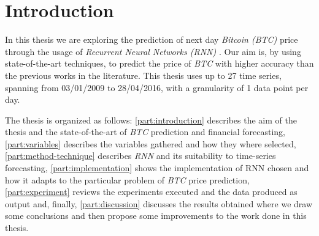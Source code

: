 
\chapter{Introduction} %

\label{ch:introduction}

In this thesis we are exploring the prediction of next day
\textit{Bitcoin (BTC)} price through the usage of \textit{Recurrent
Neural Networks (RNN)} . Our aim is, by using state-of-the-art
techniques, to predict the price of \textit{BTC} with higher accuracy than
the previous works in the literature. This thesis uses up to 27 time
series, spanning from 03/01/2009 to 28/04/2016, with a granularity of
1 data point per day.

The thesis is organized as follows: \autoref{part:introduction}
describes the aim of the thesis and the state-of-the-art of
\textit{BTC} prediction and financial forecasting,
\autoref{part:variables} describes the variables gathered and how they
where selected, \autoref{part:method-technique} describes \textit{RNN}
and its suitability to time-series forecasting,
\autoref{part:implementation} shows the implementation of RNN chosen
and how it adapts to the particular problem of \textit{BTC} price
prediction, \autoref{part:experiment} reviews the experiments executed
and the data produced as output and, finally,
\autoref{part:discussion} discusses the results obtained where we draw
some conclusions and then propose some improvements to the work done
in this thesis.

